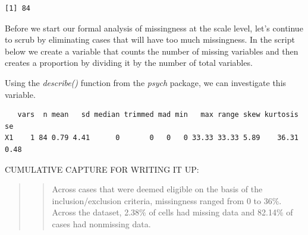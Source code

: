 \documentclass[
  11pt,
]{book}
\newenvironment{Shaded}{\begin{snugshade}}{\end{snugshade}}
\newcommand{\AttributeTok}[1]{\textcolor[rgb]{0.27,0.27,0.27}{#1}}
\newcommand{\CommentTok}[1]{\textcolor[rgb]{0.37,0.37,0.37}{\textit{#1}}}
\newcommand{\DecValTok}[1]{\textcolor[rgb]{0.06,0.06,0.06}{#1}}
\newcommand{\FunctionTok}[1]{\textcolor[rgb]{0.27,0.27,0.27}{\textbf{#1}}}
\newcommand{\NormalTok}[1]{#1}
\newcommand{\OtherTok}[1]{\textcolor[rgb]{0.37,0.37,0.37}{#1}}
\newcommand{\SpecialCharTok}[1]{\textcolor[rgb]{0.43,0.43,0.43}{\textbf{#1}}}
\begin{document}
\begin{verbatim}
[1] 84
\end{verbatim}

Before we start our formal analysis of missingness at the scale level, let's continue to scrub by eliminating cases that will have too much missingness. In the script below we create a variable that counts the number of missing variables and then creates a proportion by dividing it by the number of total variables.

Using the \emph{describe()} function from the \emph{psych} package, we can investigate this variable.

\begin{Shaded}
\end{Shaded}

\begin{verbatim}
   vars  n mean   sd median trimmed mad min   max range skew kurtosis   se
X1    1 84 0.79 4.41      0       0   0   0 33.33 33.33 5.89    36.31 0.48
\end{verbatim}

CUMULATIVE CAPTURE FOR WRITING IT UP:

\begin{quote}
\begin{quote}
Across cases that were deemed eligible on the basis of the inclusion/exclusion criteria, missingness ranged from 0 to 36\%. Across the dataset, 2.38\% of cells had missing data and 82.14\% of cases had nonmissing data.
\end{quote}
\end{quote}
\end{document}
